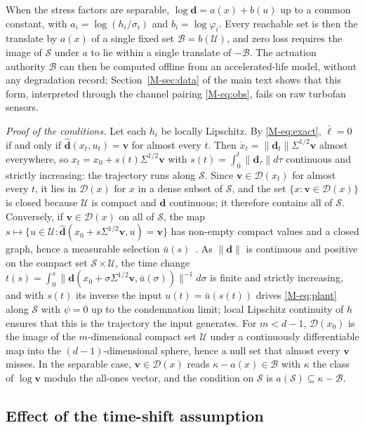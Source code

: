 \documentclass[12pt]{article}
\newcommand{\dvec}{\mathbf{d}}
\newcommand{\dhat}{\hat{\mathbf{d}}}
\newcommand{\lloss}{\ell}
\begin{document}
When the stress factors are separable, $\log\dvec=a(x)+b(u)$ up to a common
constant, with $a_i=\log(h_i/\sigma_i)$ and $b_i=\log\varphi_i$. Every
reachable set is then the translate by $a(x)$ of a single fixed set
$\mathcal B=b(\mathcal U)$, and zero loss requires the image of $\mathcal S$
under $a$ to lie within a single translate of $-\mathcal B$. The actuation
authority $\mathcal B$ can then be computed offline from an accelerated-life
model, without any degradation record; Section~\ref{M-sec:data} of the main
text shows that this form, interpreted through the channel pairing
\eqref{M-eq:obs}, fails on raw turbofan sensors.

\emph{Proof of the conditions.} Let each $h_i$ be locally Lipschitz. By
\eqref{M-eq:exact}, $\bar\lloss=0$ if and only if $\dhat(x_t,u_t)=\mathbf v$ for
almost every $t$. Then $\dot x_t=\|\dvec_t\|\Sigma^{1/2}\mathbf v$ almost
everywhere, so $x_t=x_0+s(t)\Sigma^{1/2}\mathbf v$ with
$s(t)=\int_0^t\|\dvec_\tau\|d\tau$ continuous and strictly increasing: the
trajectory runs along $\mathcal S$. Since $\mathbf v\in\mathcal D(x_t)$ for
almost every $t$, it lies in $\mathcal D(x)$ for $x$ in a dense subset of
$\mathcal S$, and the set $\{x:\mathbf v\in\mathcal D(x)\}$ is closed because
$\mathcal U$ is compact and $\dhat$ continuous; it therefore contains all of
$\mathcal S$. Conversely, if $\mathbf v\in\mathcal D(x)$ on all of
$\mathcal S$, the map
$s\mapsto\{u\in\mathcal U:\dhat(x_0+s\Sigma^{1/2}\mathbf v,u)=\mathbf v\}$ has
non-empty compact values and a closed graph, hence a measurable selection
$\bar u(s)$~\cite[Thm.~8.1.3]{aubin2009}. As $\|\dvec\|$ is continuous and
positive on the compact set $\mathcal S\times\mathcal U$, the time change
$t(s)=\int_0^{s}\|\dvec(x_0+\sigma\Sigma^{1/2}\mathbf v,\bar u(\sigma))\|^{-1}
d\sigma$ is finite and strictly increasing, and with $s(t)$ its inverse the
input $u(t)=\bar u(s(t))$ drives \eqref{M-eq:plant} along $\mathcal S$ with
$\psi=0$ up to the condemnation limit; local Lipschitz continuity of $h$
ensures that this is the trajectory the input generates. For $m<d-1$,
$\mathcal D(x_0)$ is the image of the $m$-dimensional compact set
$\mathcal U$ under a continuously differentiable map into the
$(d-1)$-dimensional sphere, hence a null set that almost every $\mathbf v$
misses. In the separable case, $\mathbf v\in\mathcal D(x)$ reads
$\kappa-a(x)\in\mathcal B$ with $\kappa$ the class of $\log\mathbf v$ modulo
the all-ones vector, and the condition on $\mathcal S$ is
$a(\mathcal S)\subseteq\kappa-\mathcal B$.

\subsection{Effect of the time-shift assumption}
\end{document}
